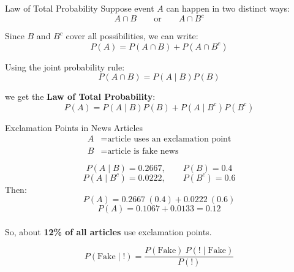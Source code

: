 \documentclass[12pt]{beamer}
\begin{document}
\begin{frame}{}
\begin{block}{Law of Total Probability}
Suppose event \(A\) can happen in two distinct ways:
\[
A \cap B
\qquad \text{or} \qquad
A \cap B^c
\]

Since \(B\) and \(B^c\) cover all possibilities, we can write:
\[
P(A) = P(A \cap B) + P(A \cap B^c)
\]

Using the joint probability rule:
\[
P(A \cap B) = P(A \mid B)P(B)
\]

we get the \textbf{Law of Total Probability}:
\[
P(A)
=
P(A \mid B)P(B)
+
P(A \mid B^c)P(B^c)
\]
\end{block}
\end{frame}

\begin{frame}{}
\begin{block}{Exclamation Points in News Articles}
\[
\begin{aligned}
A &= \text{article uses an exclamation point}\\
B &= \text{article is fake news}
\end{aligned}
\]

\[
P(A \mid B)=0.2667,
\qquad
P(B)=0.4
\]
\[
P(A \mid B^c)=0.0222,
\qquad
P(B^c)=0.6
\]
Then:
\[
P(A)
=
0.2667~(0.4) + 0.0222~(0.6)
\]
\[
P(A)
=
0.1067 + 0.0133
=
0.12
\]\\
So, about \textbf{12\% of all articles} use exclamation points.
\end{block}
\end{frame}

\begin{frame}{}
\begin{block}{}

\end{block}
\end{frame}

\begin{frame}{}
\begin{block}{}
\[
P(\text{Fake} \mid !) =
\frac{P(\text{Fake}) ~ P(! \mid \text{Fake})}{P(!)}
\]
\end{block}
\end{frame}

\begin{frame}{}
\begin{block}{}

\end{block}
\end{frame}
\end{document}
